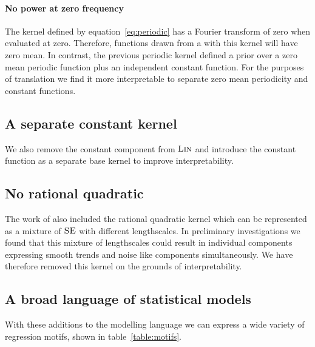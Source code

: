 \documentclass{article}
\begin{document}
\paragraph{No power at zero frequency}

The kernel defined by equation~\eqref{eq:periodic} has a Fourier transform of zero when evaluated at zero.
Therefore, functions drawn from a \gp{} with this kernel will have zero mean.
In contrast, the previous periodic kernel defined a prior over a zero mean periodic function plus an independent constant function.
For the purposes of translation we find it more interpretable to separate zero mean periodicity and constant functions.

\subsection{A separate constant kernel}


We also remove the constant component from ${\textsc{Lin}}$ and introduce the constant function as a separate base kernel to improve interpretability.

\subsection{No rational quadratic}


The work of \cite{DuvLloGroetal13} also included the rational quadratic kernel which can be represented as a mixture of ${\textsc{SE}}$ with different lengthscales.
In preliminary investigations we found that this mixture of lengthscales could result in individual components expressing smooth trends and noise like components simultaneously.
We have therefore removed this kernel on the grounds of interpretability.

\subsection{A broad language of statistical models}

With these additions to the modelling language we can express a wide variety of regression motifs, shown in table~\ref{table:motifs}.
\end{document}
